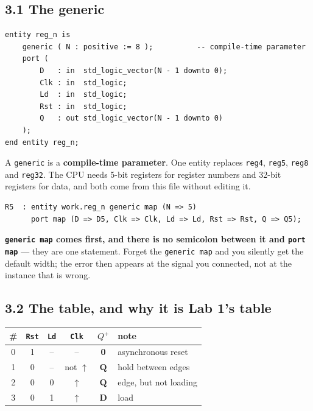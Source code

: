 \documentclass[11pt]{article}
\newcommand{\code}[1]{\texttt{#1}}
\begin{document}
\subsection*{3.1 The generic}

\begin{lstlisting}
entity reg_n is
    generic ( N : positive := 8 );          -- compile-time parameter
    port (
        D   : in  std_logic_vector(N - 1 downto 0);
        Clk : in  std_logic;
        Ld  : in  std_logic;
        Rst : in  std_logic;
        Q   : out std_logic_vector(N - 1 downto 0)
    );
end entity reg_n;
\end{lstlisting}

A \code{generic} is a \textbf{compile-time parameter}. One entity replaces
\code{reg4}, \code{reg5}, \code{reg8} and \code{reg32}. The CPU needs 5-bit
registers for register numbers and 32-bit registers for data, and both come from
this file without editing it.

\begin{lstlisting}
R5  : entity work.reg_n generic map (N => 5)
      port map (D => D5, Clk => Clk, Ld => Ld, Rst => Rst, Q => Q5);
\end{lstlisting}

\textbf{\code{generic map} comes first, and there is no semicolon between it and
\code{port map}} --- they are one statement. Forget the \code{generic map} and you
silently get the default width; the error then appears at the signal you
connected, not at the instance that is wrong.

\subsection*{3.2 The table, and why it is Lab 1's table}

\begin{center}
\begin{tabular}{c|ccc|c|l}
\toprule
\# & \code{Rst} & \code{Ld} & \code{Clk} & $Q^{+}$ & note \\
\midrule
0 & 1 & -- & -- & \textbf{0} & asynchronous reset \\
1 & 0 & -- & not $\uparrow$ & $\mathbf{Q}$ & hold between edges \\
2 & 0 & 0 & $\uparrow$ & $\mathbf{Q}$ & edge, but not loading \\
3 & 0 & 1 & $\uparrow$ & $\mathbf{D}$ & load \\
\bottomrule
\end{tabular}
\end{center}
\end{document}
